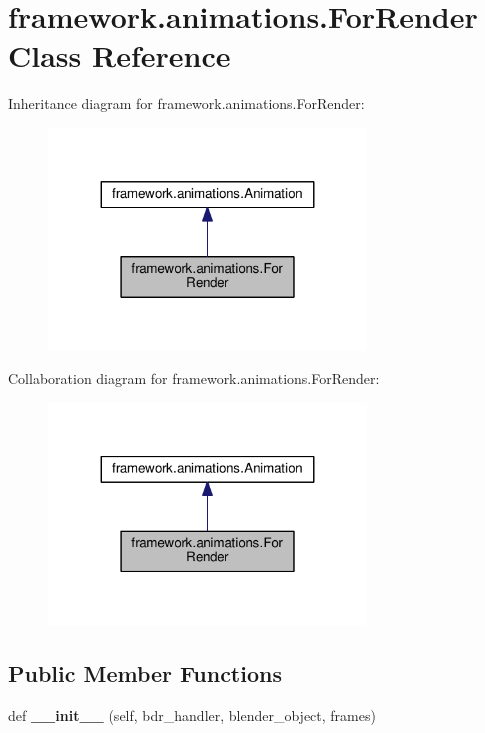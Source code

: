 \hypertarget{classframework_1_1animations_1_1ForRender}{}\section{framework.\+animations.\+For\+Render Class Reference}
\label{classframework_1_1animations_1_1ForRender}


Inheritance diagram for framework.\+animations.\+For\+Render\+:
\nopagebreak
\begin{figure}[H]
\begin{center}
\leavevmode
\includegraphics[width=239pt]{classframework_1_1animations_1_1ForRender__inherit__graph}
\end{center}
\end{figure}


Collaboration diagram for framework.\+animations.\+For\+Render\+:
\nopagebreak
\begin{figure}[H]
\begin{center}
\leavevmode
\includegraphics[width=239pt]{classframework_1_1animations_1_1ForRender__coll__graph}
\end{center}
\end{figure}
\subsection*{Public Member Functions}
\begin{DoxyCompactItemize}
\item 
def {\bfseries \+\_\+\+\_\+init\+\_\+\+\_\+} (self, bdr\+\_\+handler, blender\+\_\+object, frames)\hypertarget{classframework_1_1animations_1_1ForRender_a4a4b41229fad58fe5d672451b37f3798}{}\label{classframework_1_1animations_1_1ForRender_a4a4b41229fad58fe5d672451b37f3798}

\end{DoxyCompactItemize}
